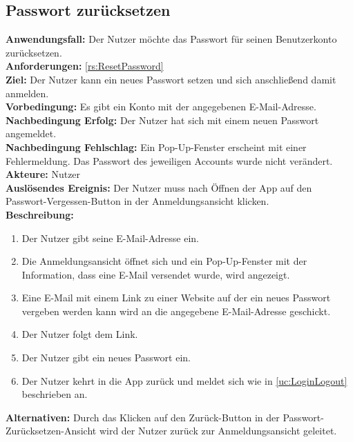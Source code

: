 \documentclass[parskip=full]{scrartcl}
\begin{document}
\subsection{Passwort zurücksetzen}
\label{uc:ResetPassword}
\textbf{Anwendungsfall:} Der Nutzer möchte das Passwort für seinen Benutzerkonto zurücksetzen.\\
\textbf{Anforderungen:} \ref{rs:ResetPassword}\\
\textbf{Ziel:} Der Nutzer kann ein neues Passwort setzen und sich anschließend damit anmelden.\\
\textbf{Vorbedingung:} Es gibt ein Konto mit der angegebenen E-Mail-Adresse.\\
\textbf{Nachbedingung Erfolg:} Der Nutzer hat sich mit einem neuen Passwort angemeldet.\\
\textbf{Nachbedingung Fehlschlag:} Ein Pop-Up-Fenster erscheint mit einer Fehlermeldung. Das Passwort des jeweiligen Accounts wurde nicht verändert.\\
\textbf{Akteure:} Nutzer\\
\textbf{Auslösendes Ereignis:} Der Nutzer muss nach Öffnen der App auf den Passwort-Vergessen-Button in der Anmeldungsansicht klicken.\\
\textbf{Beschreibung:}
\begin{enumerate}
    \item Der Nutzer gibt seine E-Mail-Adresse ein.
    \item Die Anmeldungsansicht öffnet sich und ein Pop-Up-Fenster mit der Information, dass eine E-Mail versendet wurde, wird angezeigt.
    \item Eine E-Mail mit einem Link zu einer Website auf der ein neues Passwort vergeben werden kann wird an die angegebene E-Mail-Adresse geschickt.
    \item Der Nutzer folgt dem Link.
    \item Der Nutzer gibt ein neues Passwort ein.
    \item Der Nutzer kehrt in die App zurück und meldet sich wie in \ref{uc:LoginLogout} beschrieben an.
\end{enumerate}
\textbf{Alternativen:} Durch das Klicken auf den Zurück-Button in der Passwort-Zurücksetzen-Ansicht wird der Nutzer zurück zur Anmeldungsansicht geleitet.
\newpage
\end{document}

